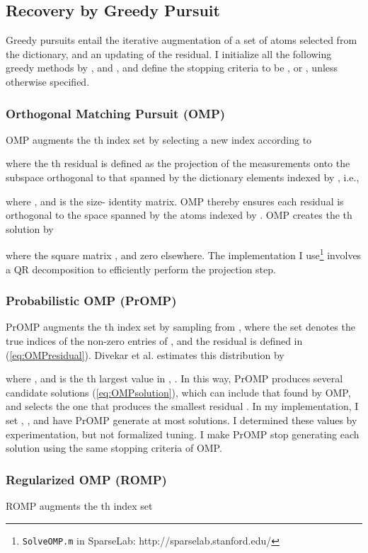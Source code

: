 \documentclass[11pt,draftcls,onecolumn]{IEEEtran}
\begin{document}
\subsection{Recovery by Greedy Pursuit}


Greedy pursuits entail the iterative augmentation of a set of 
atoms selected from the dictionary,
and an updating of the residual.
I initialize all the following greedy methods 
by , and ,
and define the stopping criteria to be 
, or ,
unless otherwise specified.

\subsubsection{Orthogonal Matching Pursuit (OMP) \cite{Pati1993}}
OMP augments the th index set 
 by selecting a new index according to

where the th residual is defined
as the projection of the measurements onto the
subspace orthogonal to that spanned by the 
dictionary elements indexed by , i.e.,

where ,
and  is the size- identity matrix.
OMP thereby ensures each residual is orthogonal
to the space spanned by the atoms indexed by .
OMP creates the th solution by

where the  square matrix , and zero elsewhere.
The implementation I use\footnote{{\tt SolveOMP.m} in SparseLab: http://sparselab.stanford.edu/}
involves a QR decomposition to efficiently perform the projection step.

\subsubsection{Probabilistic OMP (PrOMP) \cite{Divekar2010}}
PrOMP augments the th index set 
by sampling from ,
where the set  denotes the true indices of the non-zero entries of ,
and the residual is defined in (\ref{eq:OMPresidual}).
Divekar et al. \cite{Divekar2010} estimates this distribution by

where , and  is the th largest value in 
, .
In this way, PrOMP produces several candidate solutions (\ref{eq:OMPsolution}),
which can include that found by OMP,
and selects the one that produces the smallest residual .
In my implementation, I set , , 
and have PrOMP generate at most  solutions.
I determined these values by experimentation, but not formalized tuning.
I make PrOMP stop generating each solution 
using the same stopping criteria of OMP.



\subsubsection{Regularized OMP (ROMP) \cite{Needell2010}}
ROMP augments the th index set 
 
\end{document}
